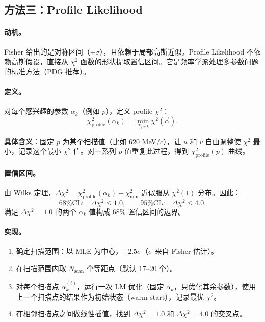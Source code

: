 \documentclass[a4paper, 11pt]{article}
\begin{document}
\subsection{方法三：Profile Likelihood}
\label{sec:profile}

\paragraph{动机。}
Fisher 给出的是对称区间（$\pm \sigma$），且依赖于局部高斯近似。Profile Likelihood 不依赖高斯假设，直接从 $\chi^2$ 函数的形状提取置信区间。它是频率学派处理多参数问题的标准方法（PDG 推荐）。

\paragraph{定义。}
对每个感兴趣的参数 $\alpha_k$（例如 $p$），定义 profile $\chi^2$：
\begin{equation}
  \chi^2_\mathrm{profile}(\alpha_k) = \min_{\alpha_{j \neq k}} \chi^2(\vec{\alpha}).
  \label{eq:profile}
\end{equation}

\textbf{具体含义}：固定 $p$ 为某个扫描值（比如 620 MeV/$c$），让 $u$ 和 $v$ 自由调整使 $\chi^2$ 最小，记录这个最小 $\chi^2$ 值。对一系列 $p$ 值重复此过程，得到 $\chi^2_\mathrm{profile}(p)$ 曲线。

\paragraph{置信区间。}
由 Wilks 定理，$\Delta\chi^2 = \chi^2_\mathrm{profile}(\alpha_k) - \chi^2_\mathrm{min}$ 近似服从 $\chi^2(1)$ 分布。因此：
\begin{equation}
  \text{68\% CL:}\quad \Delta\chi^2 \leq 1.0, \qquad
  \text{95\% CL:}\quad \Delta\chi^2 \leq 4.0.
\end{equation}
满足 $\Delta\chi^2 = 1.0$ 的两个 $\alpha_k$ 值构成 68\% 置信区间的边界。

\paragraph{实现。}
\begin{enumerate}[nosep]
  \item 确定扫描范围：以 MLE 为中心，$\pm 2.5\sigma$（$\sigma$ 来自 Fisher 估计）。
  \item 在扫描范围内取 $N_\mathrm{scan}$ 个等距点（默认 17--20 个）。
  \item 对每个扫描点 $\alpha_k^{(i)}$，运行一次 LM 优化（固定 $\alpha_k$，只优化其余参数），使用上一个扫描点的结果作为初始状态（warm-start），记录最优 $\chi^2$。
  \item 在相邻扫描点之间做线性插值，找到 $\Delta\chi^2 = 1.0$ 和 $\Delta\chi^2 = 4.0$ 的交叉点。
\end{enumerate}
\end{document}
